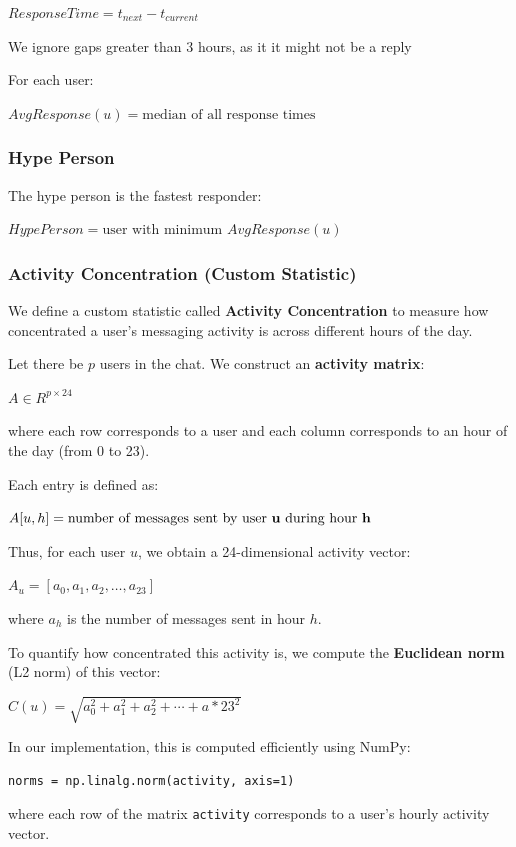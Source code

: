 \documentclass[12pt]{article}
\begin{document}
$ResponseTime = t_{next} - t_{current}$

We ignore gaps greater than 3 hours, as it it might not be a reply

For each user:

$AvgResponse(u) = \text{median of all response times}$

\subsubsection{Hype Person}

The hype person is the fastest responder:

$HypePerson = \text{user with minimum } AvgResponse(u)$

\subsubsection{Activity Concentration (Custom Statistic)}

We define a custom statistic called \textbf{Activity Concentration} to measure how concentrated a user's messaging activity is across different hours of the day.

Let there be $p$ users in the chat. We construct an \textbf{activity matrix}:

$A \in R^{p \times 24}$

where each row corresponds to a user and each column corresponds to an hour of the day (from 0 to 23).

Each entry is defined as:

$A[u, h] = \text{number of messages sent by user } {\bf {u}} \text{ during hour } \bf h$

Thus, for each user $u$, we obtain a 24-dimensional activity vector:

$A_u = [a_0, a_1, a_2, \ldots, a_{23}]$

where $a_h$ is the number of messages sent in hour $h$.

To quantify how concentrated this activity is, we compute the \textbf{Euclidean norm} (L2 norm) of this vector:

$C(u) = \sqrt{a_0^2 + a_1^2 + a_2^2 + \cdots + a*{23}^2}$

In our implementation, this is computed efficiently using NumPy:

\begin{verbatim}
norms = np.linalg.norm(activity, axis=1)
\end{verbatim}

where each row of the matrix \texttt{activity} corresponds to a user's hourly activity vector.
\end{document}
